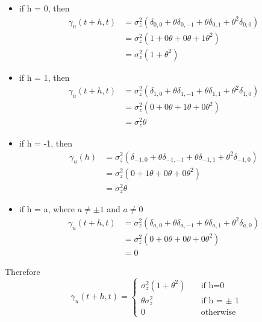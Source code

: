 \documentclass[11pt, oneside]{article}   	%
\begin{document}
\begin{itemize}
\item if h = 0, then
\begin{equation}
\begin{aligned}
\gamma_{u}(t+h,t) &= \sigma_{z}^{2}(\delta_{0,0}+\theta\delta_{0,-1}+\theta\delta_{0,1}+\theta^{2}\delta_{0,0}  )\\
 &=\sigma_{z}^{2}(1+0\theta+0\theta+1\theta^{2} )\\
 &=\sigma_{z}^{2}(1+\theta^{2} )
 \end{aligned}
 \end{equation}
 
 \item if h = 1, then
\begin{equation}
\begin{aligned}
\gamma_{u}(t+h,t) &= \sigma_{z}^{2}(\delta_{1,0}+\theta\delta_{1,-1}+\theta\delta_{1,1}+\theta^{2}\delta_{1,0}  )\\
 &=\sigma_{z}^{2}(0+ 0\theta+1\theta+0\theta^{2} )\\
 &=\sigma_{z}^{2}\theta
 \end{aligned}
 \end{equation}
 
  \item if h = -1, then
\begin{equation}
\begin{aligned}
 \gamma_{u}(h) &= \sigma_{z}^{2}(\delta_{-1,0}+\theta\delta_{-1,-1}+\theta\delta_{-1,1}+\theta^{2}\delta_{-1,0}  )\\
 &=\sigma_{z}^{2}(0+ 1\theta+0\theta+0\theta^{2} )\\
 &=\sigma_{z}^{2}\theta
 \end{aligned}
 \end{equation}
 
  \item if h = a, where $a \neq \pm 1$ and $a \neq 0$
\begin{equation}
\begin{aligned}
\gamma_{u}(t+h,t)&= \sigma_{z}^{2}(\delta_{a,0}+\theta\delta_{a,-1}+\theta\delta_{a,1}+\theta^{2}\delta_{a,0}  )\\
 &=\sigma_{z}^{2}(0+ 0\theta+0\theta+0\theta^{2} )\\
 &=0
 \end{aligned}
 \end{equation}
\end{itemize}

Therefore 
\[   
\gamma_{u}(t+h,t)= 
     \begin{cases}
       \sigma_{z}^{2}(1+\theta^{2} ) &\quad\text{if h=0}\\
       \theta \sigma_{z}^{2}&\quad\text{if h = $\pm$ 1} \\
       0 &\quad\text{otherwise}
     \end{cases}
\]
\end{document}
